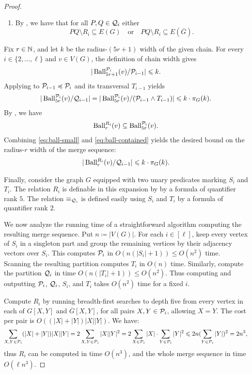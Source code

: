 \begin{proof}
\begin{enumerate}
    \item By , we have that for all $P,Q \in \mathcal Q_i$ either
    \[
        PQ \setminus R_i \subseteq E(G)
        \quad
        \text{or}
        \quad
        PQ \setminus R_i \subseteq E(\overline{G}).
    \]
    \end{enumerate}
    Fix $r\in\mathbb N$, and let $k$ be the radius-$(5r+1)$ width of the given chain.
    For every $i\in\{2,\ldots,\ell\}$ and $v\in V(G)$, the definition of chain width gives
    \[
        |\operatorname{Ball}_{5r + 1}^{\mathcal P_i}(v) / \mathcal P_{i-1}| \leqslant k.
    \]
    Applying  to
$\mathcal P_{i-1}\preccurlyeq\mathcal P_i$ and its transversal $T_{i-1}$ yields
    \begin{equation}\label{eq:ball-small}
         |\operatorname{Ball}_{5r}^{\mathcal P_i}(v) / \mathcal Q_{i-1} | = |\operatorname{Ball}_{5r}^{\mathcal P_i}(v) / (\mathcal P_{i-1} \wedge T_{i-1})| \leqslant k \cdot \pi_G(k).
    \end{equation}
    By , we have
    \begin{equation}\label{eq:ball-contained}
        \operatorname{Ball}_{r}^{R_i}(v) 
        \subseteq
        \operatorname{Ball}_{5r}^{\mathcal P_i}(v).
    \end{equation}
    Combining \eqref{eq:ball-small} and \eqref{eq:ball-contained} yields the desired bound on the radius-$r$ width of the merge sequence:
    \begin{equation*}
        |\operatorname{Ball}_{r}^{R_i}(v)/\mathcal Q_{i-1}| \leqslant k \cdot \pi_G(k).
    \end{equation*}

    Finally, consider the graph $G$ equipped with two unary predicates marking $S_i$ and $T_i$.    
    The relation $R_i$ is definable in this expansion by  by a formula of quantifier rank $5$.
    The relation $\equiv_{\mathcal Q_i}$ is
    defined easily using $S_i$ and $T_i$ by a formula of quantifier rank $2$.

    We now analyze the running time of a straightforward algorithm computing the resulting merge sequence. Put $n\coloneqq |V(G)|$.
    For each $i\in[\ell]$, keep every vertex of $S_i$ in a singleton part and group the remaining vertices by their adjacency vectors over $S_i$.
    This computes $\mathcal P_i$ in $O(n(|S_i|+1))\le O(n^2)$ time.
    Scanning the resulting partition computes $T_i$ in $O(n)$ time.
    Similarly, compute the partition $\mathcal Q_i$ in time $O(n(|T_i|+1))\le O(n^2)$.
    Thus computing and outputting $\mathcal P_i$, $\mathcal Q_i$, $S_i$, and $T_i$ takes $O(n^2)$ time for a fixed $i$.

    Compute $R_i$ by running breadth-first searches to depth five from every vertex in each of $G[X,Y]$ and $\overline G[X,Y]$, for all pairs $X,Y\in\mathcal P_i$, allowing $X=Y$.
    The cost per pair is $O((|X|+|Y|)|X||Y|)$. We have:
    \[
        \sum_{X,Y\in\mathcal P_i} (|X|+|Y|)|X||Y|
        =2\sum_{X,Y\in\mathcal P_i} |X||Y|^2
        =2\sum_{X\in\mathcal P_i} |X|\cdot \sum_{Y\in\mathcal P_i}|Y|^2
        \leqslant 2n(\sum_{Y\in\mathcal P_i}|Y|)^2=2n^3,
    \]
     thus $R_i$ can be computed in time $O(n^3)$, and the whole merge sequence in time $O(\ell n^3)$.
\end{proof}
    



